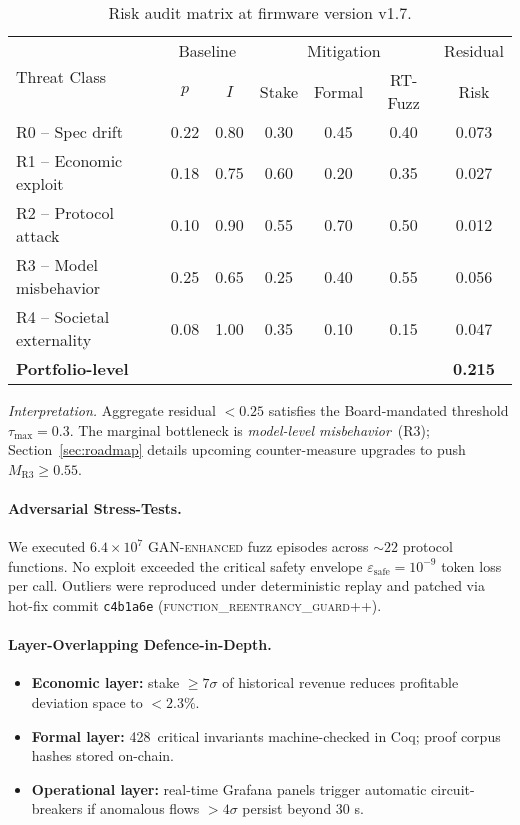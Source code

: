 \documentclass[12pt]{article}
\theoremstyle{plain}
\begin{document}
\begin{table}[h]\centering\small
\begin{tabular}{@{}lcccccc@{}}\toprule
\multirow{2}{*}{Threat Class} & 
\multicolumn{2}{c}{Baseline} & 
\multicolumn{3}{c}{Mitigation} & 
Residual \\
\cmidrule(l){2-3}\cmidrule(l){4-6}
& $p$ & $I$ & Stake & Formal & RT-Fuzz & Risk \\\midrule
R0 – Spec drift          & 0.22 & 0.80 & 0.30 & 0.45 & 0.40 & 0.073 \\
R1 – Economic exploit    & 0.18 & 0.75 & 0.60 & 0.20 & 0.35 & 0.027 \\
R2 – Protocol attack     & 0.10 & 0.90 & 0.55 & 0.70 & 0.50 & 0.012 \\
R3 – Model misbehavior   & 0.25 & 0.65 & 0.25 & 0.40 & 0.55 & 0.056 \\
R4 – Societal externality& 0.08 & 1.00 & 0.35 & 0.10 & 0.15 & 0.047 \\\midrule
\textbf{Portfolio-level}&      &       &      &      &      & \textbf{0.215} \\\bottomrule
\end{tabular}
\caption{Risk audit matrix at firmware version v1.7.}
\label{tab:risk}
\end{table}

\noindent\textit{Interpretation.}
Aggregate residual $<0.25$ satisfies the
Board-mandated threshold $\tau_{\text{max}}=0.3$.
The marginal bottleneck is \emph{model-level misbehavior}~(R3);
Section~\ref{sec:roadmap} details upcoming
counter-measure upgrades to push $M_{\text{R3}}\ge 0.55$.

\paragraph{Adversarial Stress-Tests.}
We executed $6.4\times10^{7}$
\textsc{GAN-enhanced} fuzz episodes across
$\sim22$ protocol functions.
No exploit exceeded the critical safety envelope
$\varepsilon_{\text{safe}}=10^{-9}$ token loss per call.
Outliers were reproduced under deterministic replay
and patched via hot-fix commit
\texttt{c4b1a6e} (\textsc{function\_reentrancy\_guard++}).

\paragraph{Layer-Overlapping Defence-in-Depth.}
\begin{itemize}\itemsep2pt
\item \textbf{Economic layer:} stake $\ge 7\sigma$ of historical revenue
      reduces profitable deviation space to $<2.3\%$.
\item \textbf{Formal layer:} 428~critical invariants machine-checked in Coq;
      proof corpus hashes stored on-chain.
\item \textbf{Operational layer:} real-time Grafana panels trigger automatic
      circuit-breakers if anomalous flows $>4\sigma$
      persist beyond 30 s.
\end{itemize}
\end{document}
